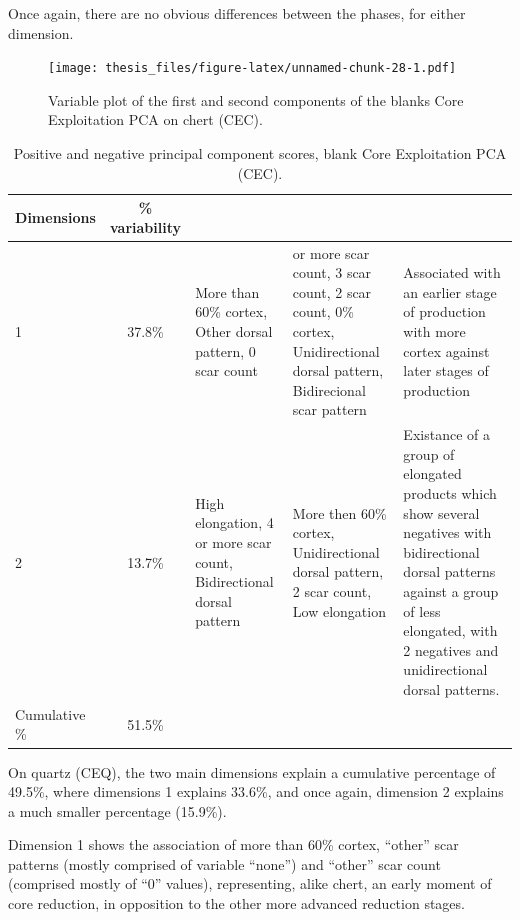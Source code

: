 \documentclass[12pt,twoside]{reedthesis}
\begin{document}
Once again, there are no obvious differences between the phases, for either dimension.
\begin{figure}
\centering
\texttt{[image: thesis\_files/figure-latex/unnamed-chunk-28-1.pdf]}
\caption{\label{fig:unnamed-chunk-28}Variable plot of the first and second components of the blanks Core Exploitation PCA on chert (CEC).}
\end{figure}
\begin{table}[!h]

\caption{\label{tab:unnamed-chunk-29}Positive and negative principal component scores, blank Core Exploitation PCA (CEC).}
\centering
\begin{tabular}[t]{lc>{\raggedright\arraybackslash}p{3cm}>{\raggedright\arraybackslash}p{3cm}>{\raggedright\arraybackslash}p{3cm}}
\toprule
\multicolumn{1}{c}{\textbf{Dimensions}} & \multicolumn{1}{c}{\textbf{\% variability}} & \multicolumn{1}{>{\centering\arraybackslash}p{3cm}}{\textbf{+}} & \multicolumn{1}{>{\centering\arraybackslash}p{3cm}}{\textbf{-}} & \multicolumn{1}{>{\centering\arraybackslash}p{3cm}}{\textbf{Interpretation}}\\
\midrule
1 & 37.8\% & More than 60\% cortex, Other dorsal pattern, 0 scar count & 4 or more scar count, 3 scar count, 2 scar count, 0\% cortex, Unidirectional dorsal pattern, Bidirecional scar pattern & Associated with an earlier stage of production with more cortex against later stages of production\\
2 & 13.7\% & High elongation, 4 or more scar count, Bidirectional dorsal pattern & More then 60\% cortex, Unidirectional dorsal pattern, 2 scar count, Low elongation & Existance of a group of elongated products which show several negatives with bidirectional dorsal patterns 
                               against a group of less elongated, with 2 negatives and unidirectional dorsal patterns.\\
Cumulative \% & 51.5\% &  &  & \\
\bottomrule
\end{tabular}
\end{table}
On quartz (CEQ), the two main dimensions explain a cumulative percentage of 49.5\%, where dimensions 1 explains 33.6\%, and once again, dimension 2 explains a much smaller percentage (15.9\%).

Dimension 1 shows the association of more than 60\% cortex, ``other'' scar patterns (mostly comprised of variable ``none'') and ``other'' scar count (comprised mostly of ``0'' values), representing, alike chert, an early moment of core reduction, in opposition to the other more advanced reduction stages.
\end{document}
